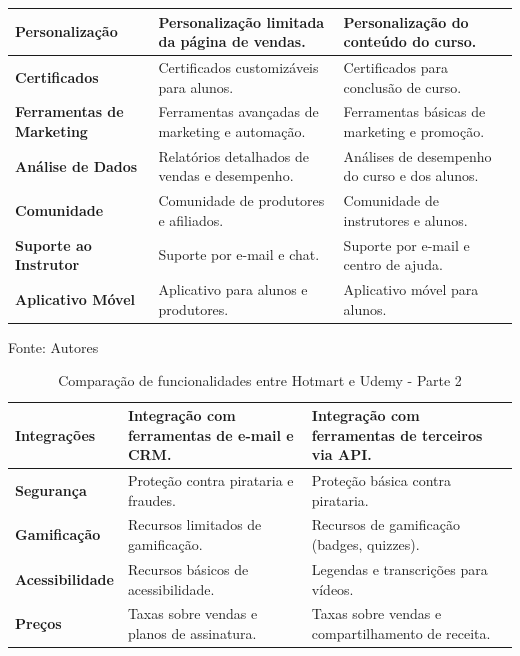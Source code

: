 \begin{apendicesenv}
\begin{table}[h]
\begin{adjustbox}{width=\textwidth}
\begin{tabular}{|p{5cm}|p{5cm}|p{5cm}|}
        \hline
        \textbf{Personalização} & Personalização limitada da página de vendas. & Personalização do conteúdo do curso. \\
        \hline
        \textbf{Certificados} & Certificados customizáveis para alunos. & Certificados para conclusão de curso. \\
        \hline
        \textbf{Ferramentas de Marketing} & Ferramentas avançadas de marketing e automação. & Ferramentas básicas de marketing e promoção. \\
        \hline
        \textbf{Análise de Dados} & Relatórios detalhados de vendas e desempenho. & Análises de desempenho do curso e dos alunos. \\
        \hline
        \textbf{Comunidade} & Comunidade de produtores e afiliados. & Comunidade de instrutores e alunos. \\
        \hline
        \textbf{Suporte ao Instrutor} & Suporte por e-mail e chat. & Suporte por e-mail e centro de ajuda. \\
        \hline
        \textbf{Aplicativo Móvel} & Aplicativo para alunos e produtores. & Aplicativo móvel para alunos. \\
        \hline
    \end{tabular}
    \end{adjustbox}

    \vspace{5mm}
    {\footnotesize Fonte: Autores} 

\end{table}

\begin{table}[h]
    \centering
    \caption{Comparação de funcionalidades entre Hotmart e Udemy - Parte 2}
    \label{tab:comparacao_hotmart_udemy2}
    \begin{adjustbox}{width=\textwidth}
    \begin{tabular}{|p{5cm}|p{5cm}|p{5cm}|}
\hline
\textbf{Integrações} & Integração com ferramentas de e-mail e CRM. & Integração com ferramentas de terceiros via API. \\
\hline
\textbf{Segurança} & Proteção contra pirataria e fraudes. & Proteção básica contra pirataria. \\
\hline
\textbf{Gamificação} & Recursos limitados de gamificação. & Recursos de gamificação (badges, quizzes). \\
\hline
\textbf{Acessibilidade} & Recursos básicos de acessibilidade. & Legendas e transcrições para vídeos. \\
\hline
\textbf{Preços} & Taxas sobre vendas e planos de assinatura. & Taxas sobre vendas e compartilhamento de receita. \\
\hline
\end{tabular}
\end{adjustbox}


\end{table}
\end{apendicesenv}
